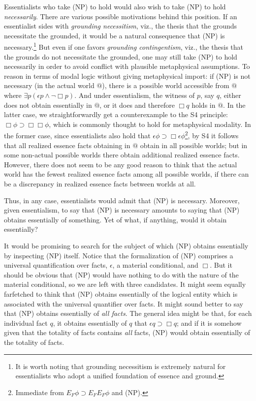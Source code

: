 \documentclass[12pt]{article}
\begin{document}
Essentialists who take (NP) to hold would also wish to take (NP) to hold \textit{necessarily}. There are various possible motivations behind this position. If an essentialist sides with \textit{grounding necessitism}, viz., the thesis that the grounds necessitate the grounded, it would be a natural consequence that (NP) is necessary.\footnote{It is worth noting that grounding necessitism is extremely natural for essentialists who adopt a unified foundation of essence and ground.} But even if one favors \textit{grounding contingentism}, viz., the thesis that the grounds do not necessitate the grounded, one may still take (NP) to hold necessarily in order to avoid conflict with plausible metaphysical assumptions. To reason in terms of modal logic without giving metaphysical import: if (NP) is not necessary (in the actual world $@$), there is a possible world accessible from $@$ where $\exists p (\epsilon p \land \lnot \Box p)$. And under essentialism, the witness of $p$, say $q$, either does not obtain essentially in $@$, or it does and therefore $\Box q$ holds in $@$. In the latter case, we straightforwardly get a counterexample to the S4 principle: $\Box \phi \supset \Box \Box \phi$, which is commonly thought to hold for metaphysical modality. In the former case, since essentialists also hold that $\epsilon \phi \supset \Box \epsilon \phi $\footnote{Immediate from $E_F \phi \supset E_F E_F \phi$ and (NP).}, by S4 it follows that all realized essence facts obtaining in $@$ obtain in all possible worlds; but in some non-actual possible worlds there obtain additional realized essence facts. However, there does not seem to be any good reason to think that the actual world has the fewest realized essence facts among all possible worlds, if there can be a discrepancy in realized essence facts between worlds at all.  
\par 
Thus, in any case, essentialists would admit that (NP) is necessary. Moreover, given essentialism, to say that (NP) is necessary amounts to saying that (NP) obtains essentially of something. Yet of what, if anything, would it obtain essentially?
\par
It would be promising to search for the subject of which (NP) obtains essentially by inspecting (NP) itself. Notice that the formalization of (NP) comprises a universal quantification over facts, $\epsilon$, a material conditional, and $\Box$. But it should be obvious that (NP) would have nothing to do with the nature of the material conditional, so we are left with three candidates. It might seem equally farfetched to think that (NP) obtains essentially of the logical entity which is associated with the universal quantifier over facts. It might sound better to say that (NP) obtains essentially of \textit{all facts}. The general idea might be that, for each individual fact $q$, it obtains essentially of $q$ that $\epsilon q \supset \Box q$; and if it is somehow given that the totality of facts contains \textit{all} facts, (NP) would obtain essentially of the totality of facts.
\end{document}
